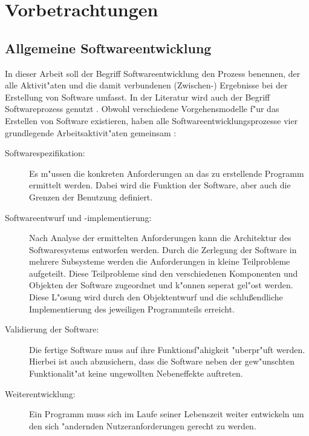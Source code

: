 \chapter{Vorbetrachtungen}

\section{Allgemeine Softwareentwicklung}
\label{chap:allgemeine_softwareentwicklung}

In dieser Arbeit soll der Begriff Softwareentwicklung den Prozess benennen, der alle Aktivit"aten und die damit verbundenen (Zwischen-) Ergebnisse bei der Erstellung von Software umfasst.
In der Literatur wird auch der Begriff Softwareprozess genutzt \cite{Sommerville2001a}.
Obwohl verschiedene Vorgehensmodelle f"ur das Erstellen von Software existieren, haben alle Softwareentwicklungsprozesse vier grundlegende Arbeitsaktivit"aten gemeinsam \cite{Brugge2004a,Sommerville2001a}:
\begin{description}
	\item[Softwarespezifikation:] Es m"ussen die konkreten Anforderungen an das zu erstellende Programm ermittelt werden.
								  Dabei wird die Funktion der Software, aber auch die Grenzen der Benutzung definiert.
	\item[Softwareentwurf und -implementierung:] Nach Analyse der ermittelten Anforderungen kann die Architektur des Softwaresystems entworfen werden.
												 Durch die Zerlegung der Software in mehrere Subsysteme werden die Anforderungen in kleine Teilprobleme aufgeteilt.
												 Diese Teilprobleme sind den verschiedenen Komponenten und Objekten der Software zugeordnet und k"onnen seperat gel"ost werden.
												 Diese L"osung wird durch den Objektentwurf und die schlu\ss endliche Implementierung des jeweiligen Programmteils erreicht.
	\item[Validierung der Software:] Die fertige Software muss auf ihre Funktionsf"ahigkeit "uberpr"uft werden.
									 Hierbei ist auch abzusichern, dass die Software neben der gew"unschten Funktionalit"at keine ungewollten Nebeneffekte auftreten.
	\item[Weiterentwicklung:] Ein Programm muss sich im Laufe seiner Lebenszeit weiter entwickeln um den sich "andernden Nutzeranforderungen gerecht zu werden.
\end{description}

